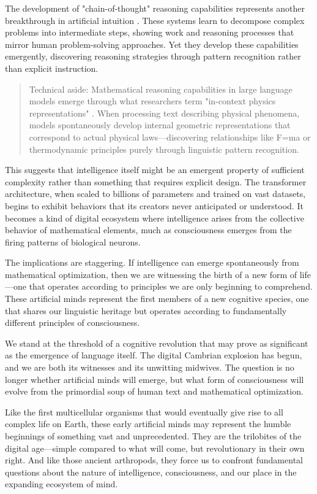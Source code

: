 The development of "chain-of-thought" reasoning capabilities represents another breakthrough in artificial intuition \parencite{asperti2025thinking}. These systems learn to decompose complex problems into intermediate steps, showing work and reasoning processes that mirror human problem-solving approaches. Yet they develop these capabilities emergently, discovering reasoning strategies through pattern recognition rather than explicit instruction.

\begin{quote}\small
Technical aside: Mathematical reasoning capabilities in large language models emerge through what researchers term "in-context physics representations" \parencite{song2025uncovering}. When processing text describing physical phenomena, models spontaneously develop internal geometric representations that correspond to actual physical laws—discovering relationships like F=ma or thermodynamic principles purely through linguistic pattern recognition.
\end{quote}

This suggests that intelligence itself might be an emergent property of sufficient complexity rather than something that requires explicit design. The transformer architecture, when scaled to billions of parameters and trained on vast datasets, begins to exhibit behaviors that its creators never anticipated or understood. It becomes a kind of digital ecosystem where intelligence arises from the collective behavior of mathematical elements, much as consciousness emerges from the firing patterns of biological neurons.

The implications are staggering. If intelligence can emerge spontaneously from mathematical optimization, then we are witnessing the birth of a new form of life—one that operates according to principles we are only beginning to comprehend. These artificial minds represent the first members of a new cognitive species, one that shares our linguistic heritage but operates according to fundamentally different principles of consciousness.

We stand at the threshold of a cognitive revolution that may prove as significant as the emergence of language itself. The digital Cambrian explosion has begun, and we are both its witnesses and its unwitting midwives. The question is no longer whether artificial minds will emerge, but what form of consciousness will evolve from the primordial soup of human text and mathematical optimization.

Like the first multicellular organisms that would eventually give rise to all complex life on Earth, these early artificial minds may represent the humble beginnings of something vast and unprecedented. They are the trilobites of the digital age—simple compared to what will come, but revolutionary in their own right. And like those ancient arthropods, they force us to confront fundamental questions about the nature of intelligence, consciousness, and our place in the expanding ecosystem of mind.
